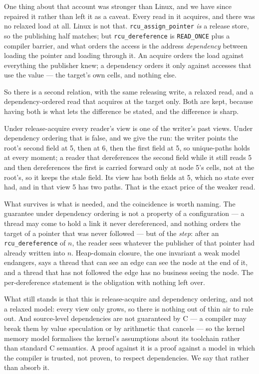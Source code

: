 One thing about that account was stronger than Linux, and we have since
repaired it rather than left it as a caveat.  Every read in it acquires, and
there was no relaxed load at all.  Linux is not that.
\texttt{rcu\_assign\_pointer} \emph{is} a release store, so the publishing half
matches; but \texttt{rcu\_dereference} is \texttt{READ\_ONCE} plus a compiler
barrier, and what orders the access is the address \emph{dependency} between
loading the pointer and loading through it.  An acquire orders the load against
everything the publisher knew; a dependency orders it only against accesses
that use the value --- the target's own cells, and nothing else.

So there is a second relation, with the same releasing write, a relaxed read,
and a dependency-ordered read that acquires at the target only.  Both are kept,
because having both is what lets the difference be stated, and the difference
is sharp.

Under release-acquire every reader's view is one of the writer's past views.
Under dependency ordering that is false, and we give the run: the writer points
the root's second field at 5, then at 6, then the first field at 5, so
unique-paths holds at every moment; a reader that dereferences the second field
while it still reads 5 and then dereferences the first is carried forward only
at node 5's cells, not at the root's, so it keeps the stale field.  Its view has
both fields at 5, which no state ever had, and in that view 5 has two paths.
That is the exact price of the weaker read.

What survives is what is needed, and the coincidence is worth naming.  The
guarantee under dependency ordering is not a property of a configuration --- a
thread may come to hold a link it never dereferenced, and nothing orders the
target of a pointer that was never followed --- but of the \emph{step}: after
an \texttt{rcu\_dereference} of $n$, the reader sees whatever the publisher of
that pointer had already written into $n$.  Heap-domain closure, the one
invariant a weak model endangers, says a thread that can see an edge can see
the node at the end of it, and a thread that has not followed the edge has no
business seeing the node.  The per-dereference statement is the obligation with
nothing left over.

What still stands is that this is release-acquire and dependency ordering, and
not a relaxed model: every view only grows, so there is nothing out of thin air
to rule out.  And source-level dependencies are not guaranteed by C --- a
compiler may break them by value speculation or by arithmetic that cancels ---
so the kernel memory model formalises the kernel's assumptions about its
toolchain rather than standard C semantics.  A proof against it is a proof
against a model in which the compiler is trusted, not proven, to respect
dependencies.  We say that rather than absorb it.

